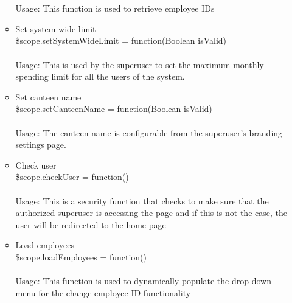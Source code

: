 \documentclass[a4paper,12pt]{article}
\begin{document}
\begin{enumerate}
\begin{itemize}
		\\ \\ Usage: This function is used to retrieve employee IDs 
		\item Set system wide limit \\ \$scope.setSystemWideLimit = function(Boolean isValid)\\ \\ Usage: This is used by the superuser to set the maximum monthly spending limit for all the users of the system.
		 \item Set canteen name \\ \$scope.setCanteenName = function(Boolean isValid) 
		\\ \\ Usage: The canteen name is configurable from the superuser's branding settings page.
		\item Check user \\ \$scope.checkUser = function() 
		\\ \\Usage: This is a security function that checks to make sure that the authorized superuser is accessing the page and if this is not the case, the user will be redirected to the home page
		\item Load employees \\ \$scope.loadEmployees = function() 
		\\ \\Usage: This function is used to dynamically populate the drop down menu for the change employee ID functionality
	\end{itemize}
\end{enumerate} 
\end{document}
